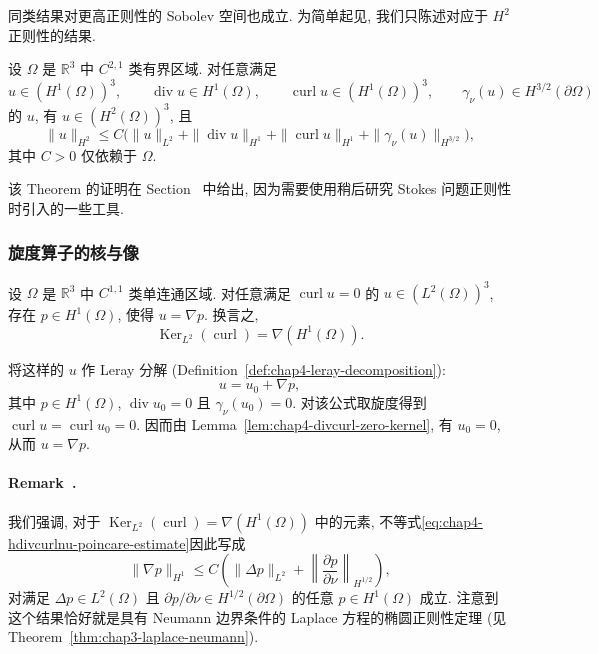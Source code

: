 同类结果对更高正则性的 Sobolev 空间也成立. 为简单起见, 我们只陈述对应于 $H^2$ 正则性的结果.

\begin{Theorem}
\label{thm:chap4-hdivcurl-h2-regularity}
设 $\Omega$ 是 $\mathbb R^3$ 中 $C^{2,1}$ 类有界区域. 对任意满足
\[
u\in(H^1(\Omega))^3,\qquad
\operatorname{div}u\in H^1(\Omega),\qquad
\operatorname{curl}u\in(H^1(\Omega))^3,\qquad
 \gamma_\nu(u)\in H^{3/2}(\partial\Omega)
\]
的 $u$, 有 $u\in(H^2(\Omega))^3$, 且
\[
 \|u\|_{H^2}\leq C\bigl(\|u\|_{L^2}+\|\operatorname{div}u\|_{H^1}
 +\|\operatorname{curl}u\|_{H^1}+\|\gamma_\nu(u)\|_{H^{3/2}}\bigr),
\]
其中 $C>0$ 仅依赖于 $\Omega$.
\end{Theorem}

该 Theorem 的证明在 Section~ 中给出,
因为需要使用稍后研究 Stokes 问题正则性时引入的一些工具.

\subsubsection{旋度算子的核与像}
\label{subsec:chap4-curl-kernel-image}

\begin{Lemma}
\label{lem:chap4-curl-kernel-gradients}
设 $\Omega$ 是 $\mathbb R^3$ 中 $C^{1,1}$ 类单连通区域. 对任意满足
$\operatorname{curl}u=0$ 的 $u\in(L^2(\Omega))^3$, 存在 $p\in H^1(\Omega)$, 使得
$u=\nabla p$. 换言之,
\[
 \operatorname{Ker}_{L^2}(\operatorname{curl})=\nabla(H^1(\Omega)).
\]
\end{Lemma}

\begin{Proof}
将这样的 $u$ 作 Leray 分解 (Definition~\ref{def:chap4-leray-decomposition}):
\[
 u=u_0+\nabla p,
\]
其中 $p\in H^1(\Omega)$, $\operatorname{div}u_0=0$ 且 $\gamma_\nu(u_0)=0$.
对该公式取旋度得到 $\operatorname{curl}u=\operatorname{curl}u_0=0$.
因而由 Lemma~\ref{lem:chap4-divcurl-zero-kernel}, 有 $u_0=0$, 从而 $u=\nabla p$.
\end{Proof}

\paragraph{Remark~\thechapterfoursectionfourremark.}\label{rem:chap4-curl-kernel-neumann-regularity}
我们强调, 对于 $\operatorname{Ker}_{L^2}(\operatorname{curl})=\nabla(H^1(\Omega))$ 中的元素,
不等式\eqref{eq:chap4-hdivcurlnu-poincare-estimate}因此写成
\[
 \|\nabla p\|_{H^1}\leq C\left(
 \|\Delta p\|_{L^2}+\left\|\frac{\partial p}{\partial\nu}\right\|_{H^{1/2}}
 \right),
\]
对满足 $\Delta p\in L^2(\Omega)$ 且
$\partial p/\partial\nu\in H^{1/2}(\partial\Omega)$ 的任意 $p\in H^1(\Omega)$ 成立.
注意到这个结果恰好就是具有 Neumann 边界条件的 Laplace 方程的椭圆正则性定理
(见 Theorem~\ref{thm:chap3-laplace-neumann}).

